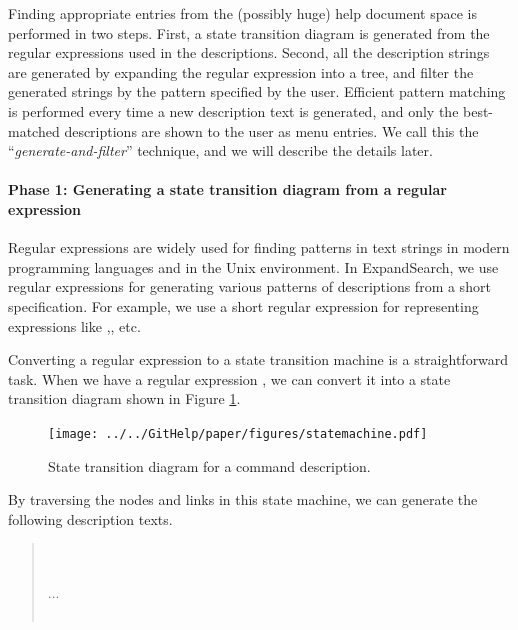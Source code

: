 \documentclass[manuscript,screen,review]{acmart}
\def\ES{\textsf{ExpandSearch}}
\begin{document}
Finding appropriate entries from the (possibly huge) help document space is
performed in two steps.
First, a state transition diagram is generated from the regular expressions
used in the descriptions.
Second, all the description strings are generated by expanding the regular expression
into a tree, and filter the generated strings by the pattern specified by the user.
Efficient pattern matching is performed every time a new description text is generated,
and only the best-matched descriptions are shown to the user as menu entries.
We call this the ``\textit{generate-and-filter}'' technique,
and we will describe the details later.

\paragraph{Phase 1: Generating a state transition diagram from a regular expression}

Regular expressions are widely used for finding patterns in text strings
in modern programming languages and in the Unix environment.
In {\ES}, we use regular expressions for
generating various patterns of descriptions from a short specification.
For example, we use a short regular expression
for representing expressions like
,, etc.

Converting a regular expression to a state transition machine is a
straightforward task.
When we have a regular expression
, 
we can convert it into a state transition diagram
shown in Figure \ref{statemachine1}.

\begin{figure}[htb]
\texttt{[image: ../../GitHelp/paper/figures/statemachine.pdf]}
\caption{State transition diagram for a  command description.}
\label{statemachine1}
\end{figure}

By traversing the nodes and links in this state machine,
we can generate the following description texts.

\begin{quote}
\small
{} \\
 \\
...\\
\\
\end{quote}
\end{document}
